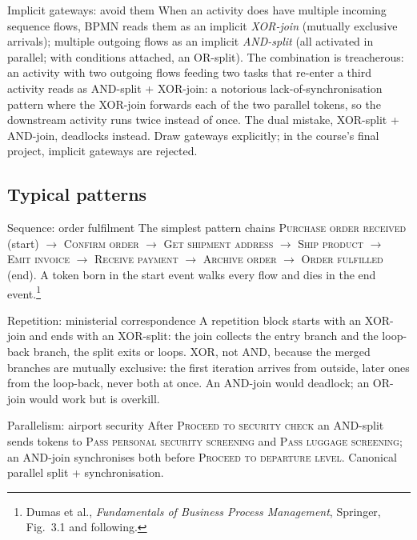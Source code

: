 \begin{notebox}{Implicit gateways: avoid them}
When an activity does have multiple incoming sequence flows, BPMN reads them as an implicit \emph{XOR-join} (mutually exclusive arrivals); multiple outgoing flows as an implicit \emph{AND-split} (all activated in parallel; with conditions attached, an OR-split). The combination is treacherous: an activity with two outgoing flows feeding two tasks that re-enter a third activity reads as AND-split + XOR-join: a notorious lack-of-synchronisation pattern where the XOR-join forwards each of the two parallel tokens, so the downstream activity runs twice instead of once. The dual mistake, XOR-split + AND-join, deadlocks instead. Draw gateways explicitly; in the course's final project, implicit gateways are rejected.
\end{notebox}

\subsection{Typical patterns}

\begin{examplebox}{Sequence: order fulfilment}
The simplest pattern chains \textsc{Purchase order received} (start) $\to$ \textsc{Confirm order} $\to$ \textsc{Get shipment address} $\to$ \textsc{Ship product} $\to$ \textsc{Emit invoice} $\to$ \textsc{Receive payment} $\to$ \textsc{Archive order} $\to$ \textsc{Order fulfilled} (end). A token born in the start event walks every flow and dies in the end event.\footnote{Dumas et al., \emph{Fundamentals of Business Process Management}, Springer, Fig.~3.1 and following.}
\end{examplebox}

\begin{examplebox}{Repetition: ministerial correspondence}
A repetition block starts with an XOR-join and ends with an XOR-split: the join collects the entry branch and the loop-back branch, the split exits or loops. XOR, not AND, because the merged branches are mutually exclusive: the first iteration arrives from outside, later ones from the loop-back, never both at once. An AND-join would deadlock; an OR-join would work but is overkill.
\end{examplebox}

\begin{examplebox}{Parallelism: airport security}
After \textsc{Proceed to security check} an AND-split sends tokens to \textsc{Pass personal security screening} and \textsc{Pass luggage screening}; an AND-join synchronises both before \textsc{Proceed to departure level}. Canonical parallel split + synchronisation.
\end{examplebox}

